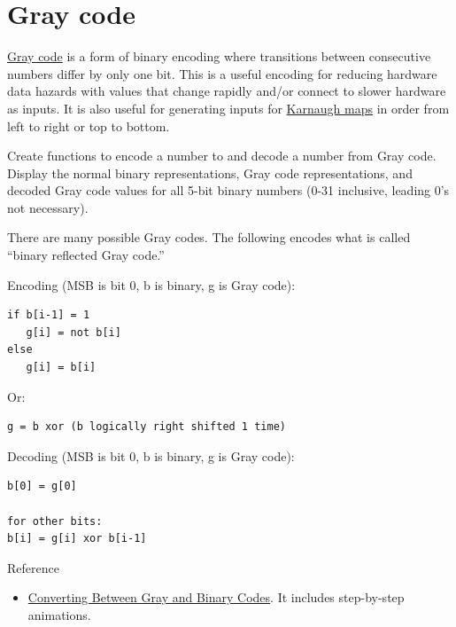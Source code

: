 \pagebreak{}
\section*{Gray code}

\href{http://en.wikipedia.org/wiki/Gray\_code}{Gray code} is a form of
binary encoding where transitions between consecutive numbers differ by
only one bit. This is a useful encoding for reducing hardware data
hazards with values that change rapidly and/or connect to slower
hardware as inputs. It is also useful for generating inputs for
\href{http://en.wikipedia.org/wiki/Karnaugh\_map}{Karnaugh maps} in
order from left to right or top to bottom.

Create functions to encode a number to and decode a number from Gray
code. Display the normal binary representations, Gray code
representations, and decoded Gray code values for all 5-bit binary
numbers (0-31 inclusive, leading 0's not necessary).

There are many possible Gray codes. The following encodes what is called
``binary reflected Gray code.''

Encoding (MSB is bit 0, b is binary, g is Gray code):

\begin{verbatim}
if b[i-1] = 1
   g[i] = not b[i]
else
   g[i] = b[i]
\end{verbatim}

Or:

\begin{verbatim}
g = b xor (b logically right shifted 1 time)
\end{verbatim}

Decoding (MSB is bit 0, b is binary, g is Gray code):

\begin{verbatim}
b[0] = g[0]

for other bits:
b[i] = g[i] xor b[i-1]
\end{verbatim}

Reference

\begin{itemize}
\item
  \href{http://www.wisc-online.com/Objects/ViewObject.aspx?ID=IAU8307}{Converting
  Between Gray and Binary Codes}. It includes step-by-step animations.
\end{itemize}



